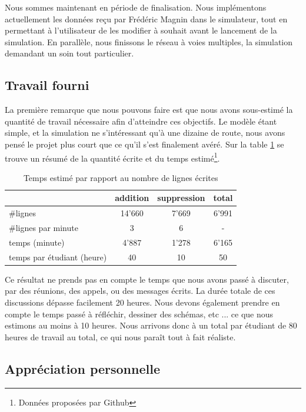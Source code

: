 \documentclass[a4paper,11pt, titlepage]{extarticle}
\begin{document}
Nous sommes maintenant en période de finalisation. Nous implémentons actuellement les données reçu par Frédéric Magnin dans le simulateur, tout en permettant à l'utilisateur de les modifier à souhait avant le lancement de la simulation. En parallèle, nous finissons le réseau à voies multiples, la simulation demandant un soin tout particulier.

\newpage

\subsection{Travail fourni}

La première remarque que nous pouvons faire est que nous avons sous-estimé la quantité de travail nécessaire afin d'atteindre ces objectifs. Le modèle étant simple, et la simulation ne s'intéressant qu'à une dizaine de route, nous avons pensé le projet plus court que ce qu'il s'est finalement avéré. Sur la table \ref{tabTemps} se trouve un résumé de la quantité écrite et du temps estimé\footnote{Données proposées par Github}.

\begin{table}[h!]
\begin{center}
\begin{tabular}{|l|c|c|c|}
\hline
 & addition & suppression & total\\ \hline
\#lignes & 14'660 & 7'669 & 6'991\\ \hline
\#lignes par minute & 3 & 6 & - \\ \hline\hline
temps (minute) & 4'887 & 1'278 & 6'165\\ \hline
temps par étudiant (heure) & 40 & 10 & 50\\ \hline
\end{tabular}
\end{center}
\caption{Temps estimé par rapport au nombre de lignes écrites}
\label{tabTemps}
\end{table}

Ce résultat ne prends pas en compte le temps que nous avons passé à discuter, par des réunions, des appels, ou des messages écrits. La durée totale de ces discussions dépasse facilement 20 heures. Nous devons également prendre en compte le temps passé à réfléchir, dessiner des schémas, etc ... ce que nous estimons au moins à 10 heures. Nous arrivons donc à un total par étudiant de 80 heures de travail au total, ce qui nous paraît tout à fait réaliste.

\subsection{Appréciation personnelle}
\end{document}
